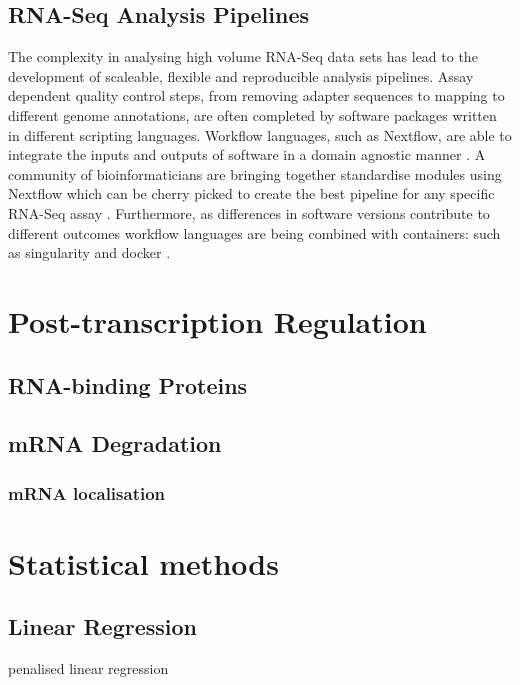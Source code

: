 \documentclass[../main.tex]{subfiles}
\begin{document}
\subsection{RNA-Seq Analysis Pipelines}

The complexity in analysing high volume RNA-Seq data sets has lead to the development of scaleable, flexible and reproducible analysis pipelines.
Assay dependent quality control steps, from removing adapter sequences to mapping to different genome annotations, are often completed by software packages written in different scripting languages.
Workflow languages, such as Nextflow, are able to integrate the inputs and outputs of software in a domain agnostic manner \parencite{DiTommaso2017}.
A community of bioinformaticians are bringing together standardise modules using Nextflow which can be cherry picked to create the best pipeline for any specific RNA-Seq assay \parencite{Ewels2020}.
Furthermore, as differences in software versions contribute to different outcomes workflow languages are being combined with containers: such as singularity and docker \parencite{DiTommaso2015}.

\section{Post-transcription Regulation}

\subsection{RNA-binding Proteins}

\subsection{mRNA Degradation}

\subsubsection{mRNA localisation}

\section{Statistical methods}

\subsection{Linear Regression}

penalised linear regression
\end{document}
